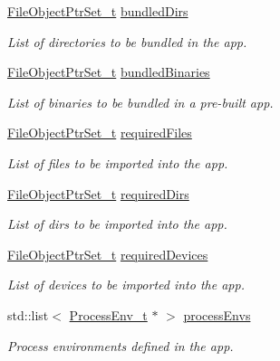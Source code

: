 \begin{DoxyCompactItemize}
\hyperlink{namespacemodel_aa2a6601c8a948122114a53c1aa584a23}{File\+Object\+Ptr\+Set\+\_\+t} \hyperlink{structmodel_1_1_app__t_a15812e8115a498b6c73dce2d1e17fb4a}{bundled\+Dirs}
\begin{DoxyCompactList}\small\item\em List of directories to be bundled in the app. \end{DoxyCompactList}\item 
\hyperlink{namespacemodel_aa2a6601c8a948122114a53c1aa584a23}{File\+Object\+Ptr\+Set\+\_\+t} \hyperlink{structmodel_1_1_app__t_a8becad9df3506e393ceedbab43181a5b}{bundled\+Binaries}
\begin{DoxyCompactList}\small\item\em List of binaries to be bundled in a pre-\/built app. \end{DoxyCompactList}\item 
\hyperlink{namespacemodel_aa2a6601c8a948122114a53c1aa584a23}{File\+Object\+Ptr\+Set\+\_\+t} \hyperlink{structmodel_1_1_app__t_a6dc066b5afe80efee6201a489583e505}{required\+Files}
\begin{DoxyCompactList}\small\item\em List of files to be imported into the app. \end{DoxyCompactList}\item 
\hyperlink{namespacemodel_aa2a6601c8a948122114a53c1aa584a23}{File\+Object\+Ptr\+Set\+\_\+t} \hyperlink{structmodel_1_1_app__t_a854759e1cb4b127d579513c0d8b1702c}{required\+Dirs}
\begin{DoxyCompactList}\small\item\em List of dirs to be imported into the app. \end{DoxyCompactList}\item 
\hyperlink{namespacemodel_aa2a6601c8a948122114a53c1aa584a23}{File\+Object\+Ptr\+Set\+\_\+t} \hyperlink{structmodel_1_1_app__t_a9c35aba02b2f04bfeb8f4a2c72ebaf62}{required\+Devices}
\begin{DoxyCompactList}\small\item\em List of devices to be imported into the app. \end{DoxyCompactList}\item 
std\+::list$<$ \hyperlink{structmodel_1_1_process_env__t}{Process\+Env\+\_\+t} $\ast$ $>$ \hyperlink{structmodel_1_1_app__t_a51f2a8eb6b993bb24e9c871ea5f5666f}{process\+Envs}
\begin{DoxyCompactList}\small\item\em Process environments defined in the app. \end{DoxyCompactList}\item 

\end{DoxyCompactItemize}
